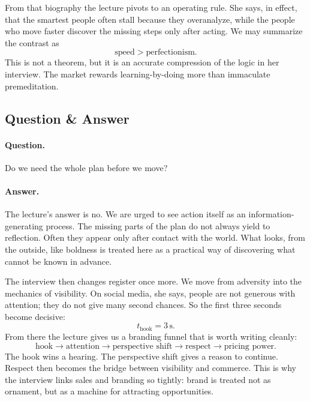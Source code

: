 From that biography the lecture pivots to an operating rule. She says, in effect, that the smartest people often stall because they overanalyze, while the people who move faster discover the missing steps only after acting. We may summarize the contrast as
\begin{equation}
\text{speed} > \text{perfectionism}.
\end{equation}
This is not a theorem, but it is an accurate compression of the logic in her interview. The market rewards learning-by-doing more than immaculate premeditation.

\subsection{Question \& Answer}

\paragraph{Question.} Do we need the whole plan before we move?

\paragraph{Answer.} The lecture's answer is no. We are urged to see action itself as an information-generating process. The missing parts of the plan do not always yield to reflection. Often they appear only after contact with the world. What looks, from the outside, like boldness is treated here as a practical way of discovering what cannot be known in advance.

The interview then changes register once more. We move from adversity into the mechanics of visibility. On social media, she says, people are not generous with attention; they do not give many second chances. So the first three seconds become decisive:
\begin{equation}
t_{\mathrm{hook}} = 3\,\mathrm{s}.
\end{equation}
From there the lecture gives us a branding funnel that is worth writing cleanly:
\begin{equation}
\text{hook} \to \text{attention} \to \text{perspective shift} \to \text{respect} \to \text{pricing power}.
\end{equation}
The hook wins a hearing. The perspective shift gives a reason to continue. Respect then becomes the bridge between visibility and commerce. This is why the interview links sales and branding so tightly: brand is treated not as ornament, but as a machine for attracting opportunities.

